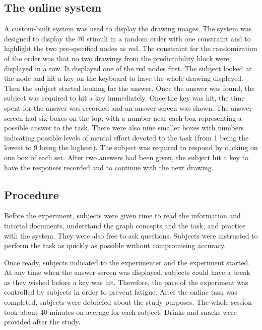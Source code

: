 \documentclass[conference,letterpaper]{IEEEtran}
\begin{document}
\subsection{The online system}



A custom-built system was used to display the drawing images. The system was designed to display the $70$ stimuli in a random order with one constraint and to highlight the two pre-specified nodes as red. The constraint for the randomization of the order was that no two drawings from the predictability block were displayed in a row. It displayed one of the red nodes first. The subject looked at the node and hit a key on the keyboard to have the whole drawing displayed. Then the subject started looking for the answer. Once the answer was found, the subject was required to hit a key immediately. Once the key was hit, the time spent for the answer was recorded and an answer screen was shown. The answer screen had six boxes on the top, with a number near each box representing a possible answer to the task. There were also nine smaller boxes with numbers indicating possible levels of mental effort devoted to the task (from 1 being the lowest to 9 being the highest). The subject was required to respond by clicking on one box of each set. After two answers had been given, the subject hit a key to have the responses recorded and to continue with the next drawing. 

\subsection{Procedure}


Before the experiment, subjects were given time to read the information and tutorial documents, understand the graph concepts and the task, and practice with the system. They were also free to ask questions. Subjects were instructed to perform the task as quickly as possible without compromising accuracy.

Once ready, subjects indicated to the experimenter and the experiment started. At any time when the answer screen was displayed, subjects could have a break as they wished before a key was hit. Therefore, the pace of the experiment was controlled by subjects in order to prevent fatigue. After the online task was completed, subjects were debriefed about the study purposes. The whole session took about 40 minutes on average for each subject. Drinks and snacks were provided after the study.
\end{document}
